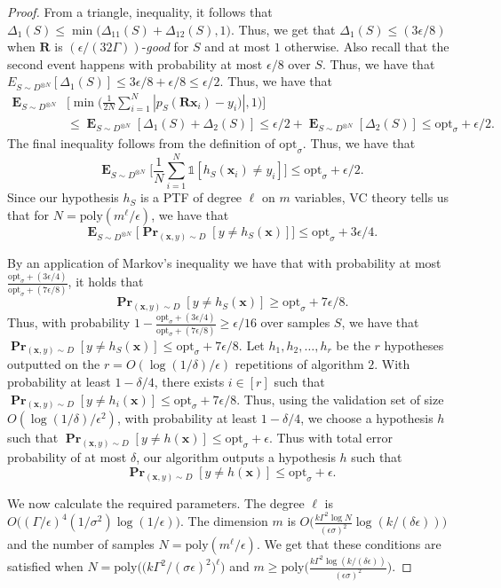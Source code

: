 \documentclass{theoretics}
\renewcommand\vec[1]{\mathbf{#1}}
\DeclareMathOperator*{\pr}{\mathbf{Pr}}
\DeclareMathOperator*{\E}{\mathbf{E}}
\newcommand{\poly}{\mathrm{poly}}
\newcommand{\1}{\Ind}
\newcommand{\smoothopt}{\mathrm{opt}_{\sigma}}
\newcommand{\x}{\vec x}
\newcommand{\Djoint}{D}
\newcommand{\ind}{\mathds{1}}
\begin{document}
\begin{proof}
From a triangle, inequality, it follows that $\Delta_1(S)\leq \min\bigl(\Delta_{11}(S)+\Delta_{12}(S),1\bigr)$. Thus, we get that $\Delta_1(S)\leq (3\epsilon/8)$ when $\vec R$ is $(\epsilon/(32\Gamma))$-\textit{good} for $S$ and at most $1$ otherwise.
Also recall that the second event happens with probability at most $\epsilon/8$ over $S$. Thus, we have that $E_{S\sim D^{\otimes N}}[\Delta_1(S)]\leq 3\epsilon/8+\epsilon/8\leq \epsilon/2$.
Thus, we have that
\begin{align*}
    \E_{S\sim D^{\otimes N}}&\biggl[\min\biggl(\frac{1}{2N}\sum_{i=1}^{N}|p_S(\vec R\x_i)-y_i)|,1\biggr)\biggr]\\&\leq \E_{S\sim D^{\otimes N}}[\Delta_1(S)+\Delta_2(S)]\leq \epsilon/2+\E_{S\sim D^{\otimes N}}[\Delta_2(S)]
\leq \smoothopt+\epsilon/2.
\end{align*}
 The final inequality follows from the definition of $\smoothopt$. Thus, we have that 
\[
\E_{S\sim D^{\otimes N}}\biggl[\frac{1}{N}\sum_{i=1}^{N}\ind[h_S(\x_i)\neq y_i]\biggr]\leq \smoothopt+\epsilon/2.
\] Since our hypothesis $h_S$ is a PTF of degree $\ell$ on $m$ variables, VC theory tells us that for $N=\poly(m^{\ell}/\epsilon)$, we have that 
\[
\E_{S\sim D^{\otimes N}}\biggl[\pr_{(\x, y) \sim \Djoint}[y\neq h_S(\x)]\biggr]\leq \smoothopt+3\epsilon/4.
\] 

By an application of Markov's inequality  we have that with probability at most $\frac{\smoothopt+(3\epsilon/4)}{\smoothopt+(7\epsilon/8)}$, it holds that 
\[
\pr_{(\x, y) \sim \Djoint}[y\neq h_S(\x)]\geq \smoothopt+7\epsilon/8.
\] Thus, with probability $1-\frac{\smoothopt+(3\epsilon/4)}{\smoothopt+(7\epsilon/8)}\geq \epsilon/16$  over samples $S$, we have that $\pr_{(\x, y) \sim \Djoint}[y\neq h_S(\x)]\leq \smoothopt+ 7\epsilon/8$. Let $h_1,h_2,\ldots, h_r$ be the $r$ hypotheses outputted on the $r=O(\log(1/\delta)/\epsilon)$ repetitions of algorithm $2$. With probability at least $1-\delta/4$, there exists $i\in [r]$ such that  $\pr_{(\x, y) \sim \Djoint}[y\neq h_i(\x)]\leq \smoothopt+ 7\epsilon/8$. Thus, using the validation set of size $O(\log(1/\delta)/\epsilon^2)$, with probability at least $1-\delta/4$, we choose a hypothesis $h$ such that $\pr_{(\x, y) \sim \Djoint}[y\neq h(\x)]\leq \smoothopt+ \epsilon$. Thus with total error probability of at most $\delta$, our algorithm outputs a hypothesis $h$ such that
\[
\pr_{(\x,y)\sim D}[y\neq h(\x)]\leq \smoothopt+\epsilon.
\]

We now calculate the required parameters. The degree $\ell$ is $O\bigl((\Gamma/\epsilon)^4(1/\sigma^2)\log(1/\epsilon)\bigr)$. The dimension $m$ is $O\bigl(\frac{k\Gamma^2\log N}{(\epsilon\sigma)^2}\log(k/(\delta\epsilon))\bigr)$ and the number of samples $N=\poly(m^{\ell}/\epsilon)$. We get that these conditions are satisfied when $N=\poly\biggl(\bigl(k\Gamma^2/(\sigma\epsilon)^2\bigr)^{\ell}\biggr)$ and $m\geq \poly\biggl(\frac{k\Gamma^2\log(k/(\delta\epsilon))}{(\epsilon\sigma)^2}\biggr)$.
\end{proof}
\end{document}
